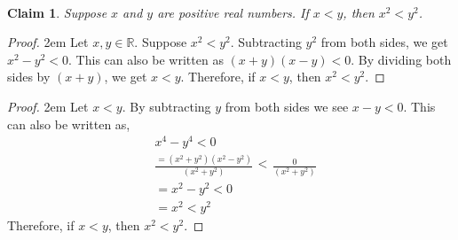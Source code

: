 \documentclass[12 pt]{article}
\newcommand{\R}{\mathbb{R}}
\theoremstyle{definition}
\theoremstyle{plain}
\theoremstyle{mytheorem}
\newtheorem{claim}{Claim}
\theoremstyle{myexample}
\theoremstyle{mydefinition}
\begin{document}
\begin{center} \underline{\hspace{\textwidth}}\\ \underline{\hspace{\textwidth}} \end{center}

\begin{claim}
Suppose $x$ and $y$ are positive real numbers.  If $x<y$, then $x^2<y^2$.
\end{claim}

\begin{proof}
\openup 2em {Let $x,y \in \R$.  Suppose $x^2<y^2$.  Subtracting $y^2$ from both sides, we get $x^2-y^2<0$.  This can also be written as $(x+y)(x-y)<0.$  By dividing both sides by $(x+y)$, we get $x<y$.  Therefore, if $x<y$, then $x^2<y^2$.}
\end{proof}

\begin{center} \underline{\hspace{\textwidth}} \end{center}

\begin{proof}
\openup 2em {Let $x<y$.  By subtracting $y$ from both sides we see $x-y<0$.  This can also be written as,
	\begin{align*}
	& x^4-y^4<0\\
	& \frac{=(x^2+y^2)(x^2-y^2)}{(x^2+y^2)} \begin{array}{c} < \\ \ \end{array} \frac{0}{(x^2+y^2)}\\
	&= x^2-y^2 <0\\
	&=x^2<y^2
	\end{align*}
	Therefore, if $x<y$, then $x^2<y^2$.}
\end{proof}
\end{document}
